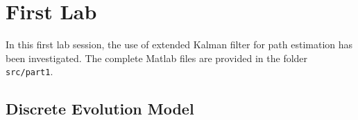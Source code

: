 \section{First Lab}

In this first lab session, the use of extended Kalman filter for path estimation has been investigated. The complete Matlab files are provided in the folder \texttt{src/part1}.

\subsection{Discrete Evolution Model}\label{secDiscreteModel}